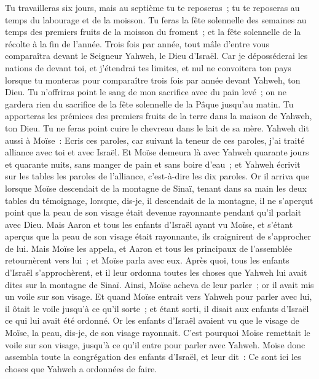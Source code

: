 \begin{multicols}{2}
Tu travailleras six jours, mais au septième tu te reposeras~; tu te reposeras au temps du labourage et de la moisson.
Tu feras la fête solennelle des semaines au temps des premiers fruits de la moisson du froment~; et la fête solennelle de la récolte à la fin de l'année.
Trois fois par année, tout mâle d'entre vous comparaîtra devant le Seigneur Yahweh, le Dieu d'Israël.
Car je déposséderai les nations de devant toi, et j'étendrai tes limites, et nul ne convoitera ton pays lorsque tu monteras pour comparaître trois fois par année devant Yahweh, ton Dieu.
Tu n'offriras point le sang de mon sacrifice avec du pain levé~; on ne gardera rien du sacrifice de la fête solennelle de la Pâque jusqu'au matin.
Tu apporteras les prémices des premiers fruits de la terre dans la maison de Yahweh, ton Dieu. Tu ne feras point cuire le chevreau dans le lait de sa mère.
Yahweh dit aussi à Moïse~: Ecris ces paroles, car suivant la teneur de ces paroles, j'ai traité alliance avec toi et avec Israël.
Et Moïse demeura là avec Yahweh quarante jours et quarante nuits, sans manger de pain et sans boire d'eau~; et Yahweh écrivit sur les tables les paroles de l'alliance, c'est-à-dire les dix paroles.
Or il arriva que lorsque Moïse descendait de la montagne de Sinaï, tenant dans sa main les deux tables du témoignage, lorsque, dis-je, il descendait de la montagne, il ne s'aperçut point que la peau de son visage était devenue rayonnante pendant qu'il parlait avec Dieu.
Mais Aaron et tous les enfants d'Israël ayant vu Moïse, et s'étant aperçus que la peau de son visage était rayonnante, ils craignirent de s'approcher de lui.
Mais Moïse les appela, et Aaron et tous les principaux de l'assemblée retournèrent vers lui~; et Moïse parla avec eux.
Après quoi, tous les enfants d'Israël s'approchèrent, et il leur ordonna toutes les choses que Yahweh lui avait dites sur la montagne de Sinaï.
Ainsi, Moïse acheva de leur parler~; or il avait mis un voile sur son visage.
Et quand Moïse entrait vers Yahweh pour parler avec lui, il ôtait le voile jusqu'à ce qu'il sorte~; et étant sorti, il disait aux enfants d'Israël ce qui lui avait été ordonné.
Or les enfants d'Israël avaient vu que le visage de Moïse, la peau, dis-je, de son visage rayonnait. C'est pourquoi Moïse remettait le voile sur son visage, jusqu'à ce qu'il entre pour parler avec Yahweh.
\VerseOne{}Moïse donc assembla toute la congrégation des enfants d'Israël, et leur dit~: Ce sont ici les choses que Yahweh a ordonnées de faire.

\end{multicols}
